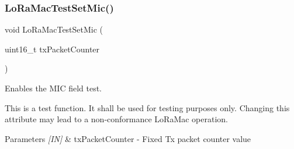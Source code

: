 \subsubsection{\texorpdfstring{Lo\+Ra\+Mac\+Test\+Set\+Mic()}{LoRaMacTestSetMic()}}
{\footnotesize\ttfamily void Lo\+Ra\+Mac\+Test\+Set\+Mic (\begin{DoxyParamCaption}\item[{uint16\+\_\+t}]{tx\+Packet\+Counter }\end{DoxyParamCaption})}



Enables the M\+IC field test. 

This is a test function. It shall be used for testing purposes only. Changing this attribute may lead to a non-\/conformance Lo\+Ra\+Mac operation.


\begin{DoxyParams}{Parameters}
{\em \mbox{[}\+I\+N\mbox{]}} & tx\+Packet\+Counter -\/ Fixed Tx packet counter value \\
\hline
\end{DoxyParams}
